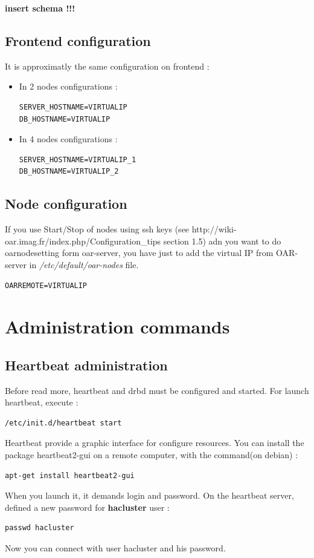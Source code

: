 \documentclass[a4paper,10pt]{report}
\begin{document}
\textbf{insert schema !!!}

\subsection{Frontend configuration}
It is approximatly the same configuration on frontend :\\
\begin{itemize}
 \item In 2 nodes configurations :
\begin{lstlisting}
SERVER_HOSTNAME=VIRTUALIP
DB_HOSTNAME=VIRTUALIP
\end{lstlisting}
\item In 4 nodes configurations :
\begin{lstlisting}
SERVER_HOSTNAME=VIRTUALIP_1
DB_HOSTNAME=VIRTUALIP_2
\end{lstlisting}
\end{itemize}

\subsection{Node configuration}
If you use Start/Stop of nodes using ssh keys (see http://wiki-oar.imag.fr/index.php/Configuration\_tips section 1.5) adn you want to do oarnodesetting form oar-server, 
you have just to add the virtual IP from OAR-server in \textit{/etc/default/oar-nodes} file.
\begin{lstlisting}
OARREMOTE=VIRTUALIP
\end{lstlisting}

\section{Administration commands}

\subsection{Heartbeat administration}
Before read more, heartbeat and drbd must be configured and started. For launch heartbeat, execute :
\begin{lstlisting}
/etc/init.d/heartbeat start
\end{lstlisting}
Heartbeat provide a graphic interface for configure resources. You can install the package heartbeat2-gui on a remote computer, with the command(on debian) :
\begin{lstlisting}
apt-get install heartbeat2-gui
\end{lstlisting}
When you launch it, it demands login and password. On the heartbeat server, defined a new password for \textbf{hacluster} user :
\begin{lstlisting}
passwd hacluster
\end{lstlisting}
Now you can connect with user hacluster and his password.
\end{document}
